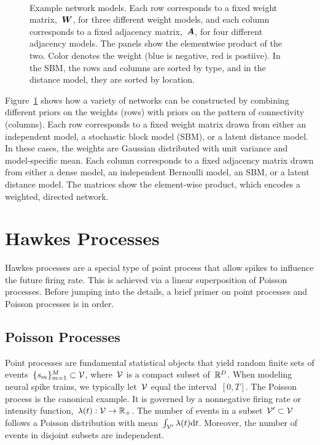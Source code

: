 \begin{figure}[t!]
\begin{subfigure}[b]{1.10in}
  \end{subfigure}
  \\
  \vspace{-.1in}
  \caption[Examples of network models]{Example network models.  Each
    row corresponds to a fixed weight matrix,~$\boldsymbol{W}$, for three
    different weight models, and each column corresponds to a fixed
    adjacency matrix,~$\boldsymbol{A}$, for four different adjacency models. The
    panels show the elementwise product of the two. Color denotes the
    weight (blue is negative, red is postiive).  In the SBM, the rows
    and columns are sorted by type, and in the distance model, they
    are sorted by location. }
  \label{fig:network_models}
\end{figure}

Figure~\ref{fig:network_models} shows how a variety of networks can be
constructed by combining different priors on the weights (rows) with
priors on the pattern of connectivity (columns). Each row corresponds
to a fixed weight matrix drawn from either an independent model, a
stochastic block model (SBM), or a latent distance model. In these
cases, the weights are Gaussian distributed with unit variance and
model-specific mean. Each column corresponds to a fixed adjacency
matrix drawn from either a dense model, an independent
Bernoulli model, an SBM, or a latent distance model. The matrices show
the element-wise product, which encodes a weighted, directed
network. 


\section{Hawkes Processes}
Hawkes processes \cite{Hawkes-1971} are a special type of point process
that allow spikes to influence the future firing rate. This is achieved
via a linear superposition of Poisson processes. Before jumping into the
details, a brief primer on point processes and Poisson processes is in
order.

\subsection{Poisson Processes}
\sloppy Point processes are fundamental statistical objects that yield
random finite sets of events~${\{s_m\}_{m=1}^M \subset \mathcal{V}}$,
where~$\mathcal{V}$ is a compact subset of~${\mathbb{R}^D}$.  When modeling
neural spike trains, we typically let~${\mathcal{V}}$ equal the
interval~${[0,T]}$. The Poisson process is the canonical example. It
is governed by a nonnegative firing rate or intensity
function,~${\lambda(t): \mathcal{V} \rightarrow\mathbb{R}_+}$. The number of
events in a subset~${\mathcal{V}'\subset\mathcal{V}}$ follows a Poisson distribution
with mean~${\int_{\mathcal{V}'}\lambda(t)\mathrm{d}t}$. Moreover, the number
of events in disjoint subsets are independent.

